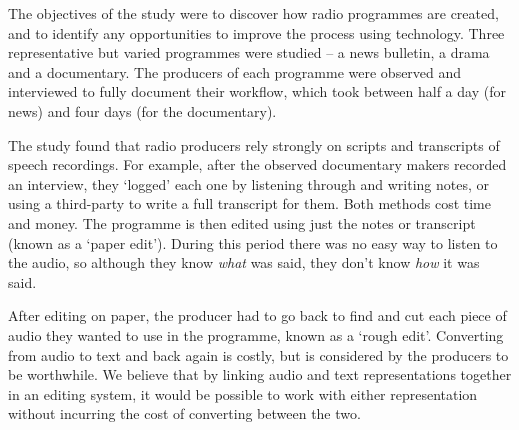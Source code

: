 

The objectives of the study were to discover how radio programmes are created,
and to identify any opportunities to improve the process using technology.
Three representative but varied programmes were studied -- a news bulletin, a
drama and a documentary. The producers of each programme were observed and
interviewed to fully document their workflow, which took between half a day
(for news) and four days (for the documentary).

The study found that radio producers rely strongly on scripts and transcripts of
speech recordings. For example, after the observed documentary makers recorded
an interview, they `logged' each one by listening through and writing notes, or
using a third-party to write a full transcript for them. Both methods cost
time and money. The programme is then edited using just the notes or transcript
(known as a `paper edit'). During this period there was no easy way to listen
to the audio, so although they know \textit{what} was said, they don't know
\textit{how} it was said.

After editing on paper, the producer had to go back to find and cut each
piece of audio they wanted to use in the programme, known as a `rough edit'.
Converting from audio to text and back again is costly, but is considered by
the producers to be worthwhile.
We believe that by linking audio and text representations together in an
editing system, it would be possible to work with either representation without
incurring the cost of converting between the two.



